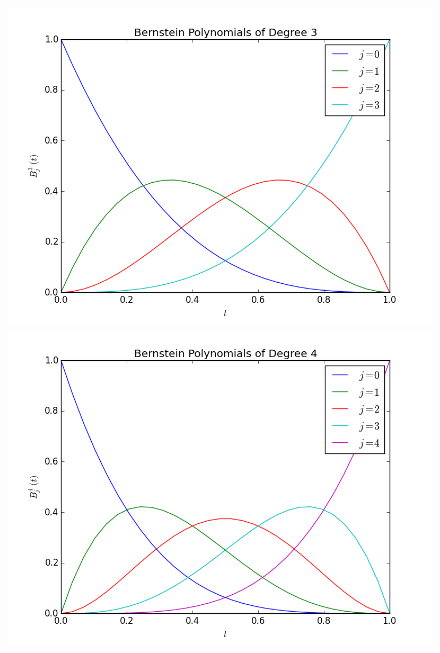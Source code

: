 \documentclass[]{article}
\begin{document}
\begin{figure}[h!]
\includegraphics[scale=0.4]{Bernstein_deg3}
\includegraphics[scale=0.4]{Bernstein_deg4}
\end{figure}
\end{document}
